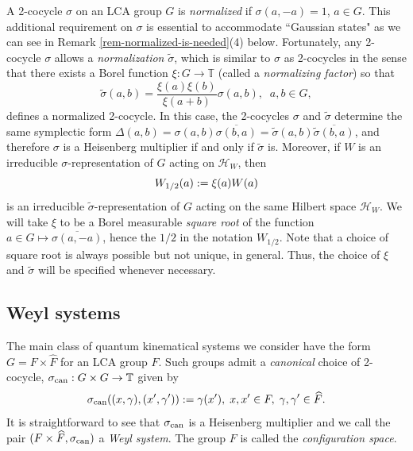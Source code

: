 \documentclass[12pt,reqno]{amsart}
\theoremstyle{definition}
\theoremstyle{definition}
\theoremstyle{definition}
\numberwithin{thm}{section}
\numberwithin{equation}{section}
\newcommand{\Hi}{\mathcal{H}}
\newcommand{\tor}{\mathbb{T}}
\begin{document}
A 2-cocycle $\sigma$ on an LCA group $G$ is {\em normalized} if $\sigma(a,-a)=1$, $a\in G$. This additional requirement on $\sigma$ is essential to accommodate ``Gaussian states" as we can see in Remark \ref{rem-normalized-is-needed}(4) below.
Fortunately, any 2-cocycle $\sigma$ allows a {\em normalization} $\tilde{\sigma}$, which is similar to $\sigma$ as 2-cocycles in the sense that there exists a Borel function $\xi:G\to \tor$ (called a {\em normalizing factor}) so that
    \begin{equation}\label{eq-equivalent-cocycle}
        \tilde{\sigma}(a,b)=\frac{\xi(a)\xi(b)}{\xi(a+b)}\sigma(a,b),\;\; a,b\in G,
    \end{equation}
defines a normalized 2-cocycle.
In this case, the 2-cocycles $\sigma$ and $\tilde{\sigma}$ determine the same symplectic form $\Delta(a,b)=\sigma(a,b)\overline{\sigma(b,a)} = \tilde{\sigma}(a,b)\overline{\tilde{\sigma}(b,a)}$, and therefore $\sigma$ is a Heisenberg multiplier if and only if $\tilde{\sigma}$ is. Moreover, if $W$ is an irreducible $\sigma$-representation of $G$ acting on $\Hi_W$, then \begin{equation}
  \notag   W_{1/2}(a):=\xi(a)W(a)
\end{equation}
is an irreducible $\tilde{\sigma}$-representation of $G$ acting on the same Hilbert space $\Hi_{W}$. We will take $\xi$ to be a Borel measurable {\em square root} of the function $a\in G \mapsto \overline{\sigma(a,-a)}$, hence the $1/2$ in the notation $W_{1/2}$.
Note that a choice of square root is always possible but not unique, in general. Thus, the choice of $\xi$ and $\tilde{\sigma}$ will be specified whenever necessary.


\subsection{Weyl systems}\label{sec-first-ex}

The main class of quantum kinematical systems we consider have the form $G=F\times \widehat{F}$ for an LCA group $F$. Such groups admit a {\em canonical} choice of 2-cocycle, $\sigma_{\rm can}: G\times G \to \tor$ given by
    \begin{equation}\label{eq-can-2-cocycle}
        \sigma_{\rm can}((x,\gamma), (x', \gamma')) :=  \gamma(x'),\; x,x'\in F,\; \gamma, \gamma'\in \widehat{F}.
    \end{equation}
It is straightforward to see that $\sigma_{\rm can}$ is a Heisenberg multiplier and we call the pair $(F\times \widehat{F}, \sigma_{\rm can})$ a {\em Weyl system}. The group $F$ is called the {\em configuration space}.
\end{document}
